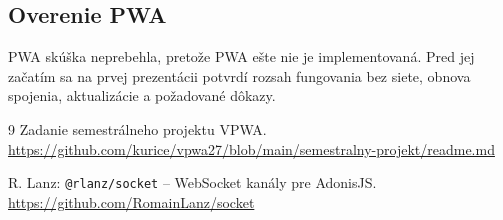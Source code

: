 \documentclass[11pt,a4paper]{article}
\begin{document}
\subsection{Overenie PWA}
PWA skúška neprebehla, pretože PWA ešte nie je implementovaná.
Pred jej začatím sa na prvej prezentácii potvrdí rozsah fungovania bez
siete, obnova spojenia, aktualizácie a požadované dôkazy.

\begin{thebibliography}{9}
  Zadanie semestrálneho projektu VPWA.\newline
  \url{https://github.com/kurice/vpwa27/blob/main/semestralny-projekt/readme.md}

  R. Lanz: \texttt{@rlanz/socket} -- WebSocket kanály pre AdonisJS.\newline
  \url{https://github.com/RomainLanz/socket}

\end{thebibliography}
\end{document}
